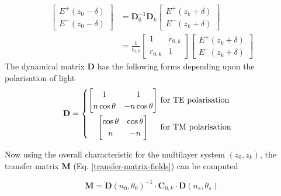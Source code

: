 \documentclass[10pt,a4paper,portrait]{report}
\begin{document}
\begin{equation}\label{dynamical-definition}
\begin{aligned}
  \begin{bmatrix}
    E^+\left( z_0 - \delta \right) \\
    E^-\left( z_0 - \delta \right)
  \end{bmatrix} &=
  \mathbf{D}^{-1}_{0} \mathbf{D}_{k}
  \begin{bmatrix}
    E^+\left( z_k + \delta \right) \\
    E^-\left( z_k + \delta \right)
  \end{bmatrix}
  \\
  &=
  \frac{1}{t_{0,k}}
  \begin{bmatrix}
    1       & r_{0,k} \\
    r_{0,k} & 1
  \end{bmatrix}
  \begin{bmatrix}
    E^+\left( z_k + \delta \right) \\
    E^-\left( z_k + \delta \right)
  \end{bmatrix}
\end{aligned}
\end{equation}
The dynamical matrix $\mathbf{D}$ has the following forms depending upon the polarisation of light
\begin{equation}
  \mathbf{D} = 
  \begin{cases}
    \begin{aligned}
      \begin{bmatrix}
        1 & 1 \\
        n\cos\theta & -n\cos\theta
      \end{bmatrix} &
        \mbox{    for TE polarisation} \\
      \begin{bmatrix}
        \cos\theta & \cos\theta \\
        n & -n
      \end{bmatrix}\hspace{4.1mm} &
        \mbox{    for TM polarisation}
    \end{aligned}
  \end{cases}
\end{equation}

\noindent
Now using the overall characteristic for the multilayer system $(z_0,z_k)$, the transfer matrix $\mathbf{M}$ (Eq. \ref{transfer-matrix-fields}) can be computed 

\begin{equation}
\mathbf{M} = 
\mathbf{D} \left( n_0, \theta_0 \right)^{-1} \cdot
\mathbf{C}_{0,k} \cdot
\mathbf{D} \left( n_s, \theta_s \right)
\end{equation}
\end{document}
